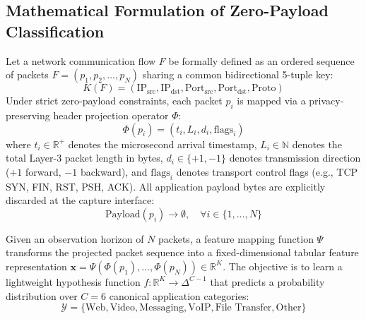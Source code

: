 \documentclass[conference]{IEEEtran}
\begin{document}
\subsection{Mathematical Formulation of Zero-Payload Classification}
Let a network communication flow $F$ be formally defined as an ordered sequence of packets $F = (p_1, p_2, \dots, p_N)$ sharing a common bidirectional 5-tuple key:
\begin{equation}
    K(F) = (\text{IP}_{\text{src}}, \text{IP}_{\text{dst}}, \text{Port}_{\text{src}}, \text{Port}_{\text{dst}}, \text{Proto})
\end{equation}
Under strict zero-payload constraints, each packet $p_i$ is mapped via a privacy-preserving header projection operator $\Phi$:
\begin{equation}
    \Phi(p_i) = (t_i, L_i, d_i, \text{flags}_i)
\end{equation}
where $t_i \in \mathbb{R}^+$ denotes the microsecond arrival timestamp, $L_i \in \mathbb{N}$ denotes the total Layer-3 packet length in bytes, $d_i \in \{+1, -1\}$ denotes transmission direction ($+1$ forward, $-1$ backward), and $\text{flags}_i$ denotes transport control flags (e.g., TCP SYN, FIN, RST, PSH, ACK). All application payload bytes are explicitly discarded at the capture interface:
\begin{equation}
    \text{Payload}(p_i) \to \emptyset, \quad \forall i \in \{1, \dots, N\}
\end{equation}

Given an observation horizon of $N$ packets, a feature mapping function $\Psi$ transforms the projected packet sequence into a fixed-dimensional tabular feature representation $\mathbf{x} = \Psi\left(\Phi(p_1), \dots, \Phi(p_N)\right) \in \mathbb{R}^K$. The objective is to learn a lightweight hypothesis function $f: \mathbb{R}^K \to \Delta^{C-1}$ that predicts a probability distribution over $C=6$ canonical application categories:
\begin{equation}
    \mathcal{Y} = \{\text{Web}, \text{Video}, \text{Messaging}, \text{VoIP}, \text{File Transfer}, \text{Other}\}
\end{equation}
\end{document}
